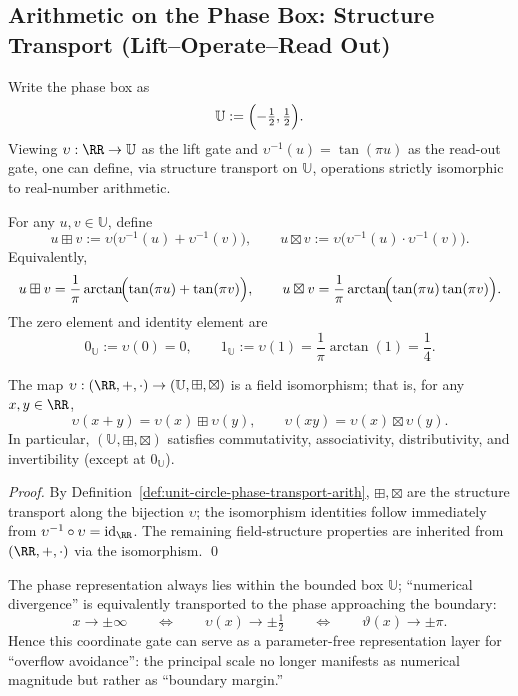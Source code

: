 \subsection{Arithmetic on the Phase Box: Structure Transport (Lift--Operate--Read Out)}\label{subsec:unit-circle-phase-arithmetic}
Write the phase box as
\[
\mathbb{U}:=\Bigl(-\tfrac12,\tfrac12\Bigr).
\]
Viewing \(\upsilon:\RR\to\mathbb{U}\) as the lift gate and \(\upsilon^{-1}(u)=\tan(\pi u)\) as the read-out gate, one can define, via structure transport on \(\mathbb{U}\), operations strictly isomorphic to real-number arithmetic.

\begin{definition}\label{def:unit-circle-phase-transport-arith}
For any \(u,v\in\mathbb{U}\), define
\[
u\boxplus v
:=\upsilon\!\bigl(\upsilon^{-1}(u)+\upsilon^{-1}(v)\bigr),
\qquad
u\boxtimes v
:=\upsilon\!\bigl(\upsilon^{-1}(u)\cdot\upsilon^{-1}(v)\bigr).
\]
Equivalently,
\[
u\boxplus v=\frac{1}{\pi}\arctan\!\Bigl(\tan(\pi u)+\tan(\pi v)\Bigr),
\qquad
u\boxtimes v=\frac{1}{\pi}\arctan\!\Bigl(\tan(\pi u)\tan(\pi v)\Bigr).
\]
The zero element and identity element are
\[
0_{\mathbb{U}}:=\upsilon(0)=0,
\qquad
1_{\mathbb{U}}:=\upsilon(1)=\frac{1}{\pi}\arctan(1)=\frac14.
\]
\end{definition}

\begin{theorem}\label{thm:unit-circle-phase-field-iso}
The map
\(
\upsilon:(\RR,+,\cdot)\to(\mathbb{U},\boxplus,\boxtimes)
\)
is a field isomorphism; that is, for any \(x,y\in\RR\),
\[
\upsilon(x+y)=\upsilon(x)\boxplus\upsilon(y),
\qquad
\upsilon(xy)=\upsilon(x)\boxtimes\upsilon(y).
\]
In particular, \((\mathbb{U},\boxplus,\boxtimes)\) satisfies commutativity, associativity, distributivity, and invertibility (except at \(0_{\mathbb{U}}\)).
\end{theorem}
\begin{proof}
By Definition~\ref{def:unit-circle-phase-transport-arith}, \(\boxplus,\boxtimes\) are the structure transport along the bijection \(\upsilon\); the isomorphism identities follow immediately from \(\upsilon^{-1}\circ \upsilon=\mathrm{id}_\RR\). The remaining field-structure properties are inherited from \((\RR,+,\cdot)\) via the isomorphism. \qed
\end{proof}

\begin{remark}\label{rem:unit-circle-phase-bounded}
The phase representation always lies within the bounded box \(\mathbb{U}\); ``numerical divergence'' is equivalently transported to the phase approaching the boundary:
\[
x\to\pm\infty\qquad\Longleftrightarrow\qquad \upsilon(x)\to\pm\tfrac12
\qquad\Longleftrightarrow\qquad \vartheta(x)\to\pm\pi.
\]
Hence this coordinate gate can serve as a parameter-free representation layer for ``overflow avoidance'': the principal scale no longer manifests as numerical magnitude but rather as ``boundary margin.''
\end{remark}

